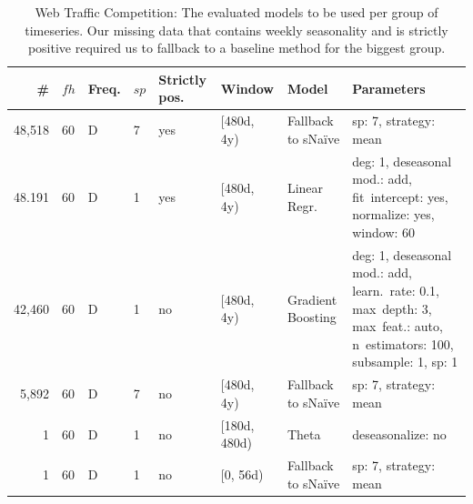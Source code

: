 \begin{table}
\fontsize{9pt}{12pt}\selectfont
\begin{tabular}{rlllll|lp{5cm}}
\#      & $fh$ & Freq. & $sp$ & Strictly pos. & Window       & Model                & Parameters \\
\hline
 48,518 &  60  & D     & 7    & yes           & [480d,   4y) & Fallback to sNa\"ive & sp: 7, strategy: mean \\
 48.191 &  60  & D     & 1    & yes           & [480d,   4y) & Linear Regr.         & deg: 1, deseasonal mod.: add, fit~intercept: yes, normalize: yes, window: 60 \\
 42,460 &  60  & D     & 1    & no            & [480d,   4y) & Gradient Boosting    & deg: 1, deseasonal mod.: add, learn.~rate: 0.1, max~depth: 3, max~feat.: auto, n~estimators: 100, subsample: 1, sp: 1 \\
  5,892 &  60  & D     & 7    & no            & [480d,   4y) & Fallback to sNa\"ive & sp: 7, strategy: mean \\
      1 &  60  & D     & 1    & no            & [180d, 480d) & Theta                & deseasonalize: no \\
      1 &  60  & D     & 1    & no            & [0,     56d) & Fallback to sNa\"ive & sp: 7, strategy: mean \\
\end{tabular}
\caption{Web Traffic Competition: The evaluated models to be used per group of timeseries. Our missing data that contains weekly seasonality and is strictly positive required us to fallback to a baseline method for the biggest group.}
\label{tab:webTrafficGroupsAndModels}
\end{table}
